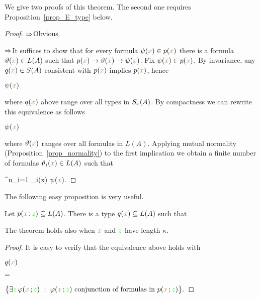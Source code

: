 We give two proofs of this theorem.  The second one requires Proposition~\ref{prop_E_type} below.

\vspace*{-\parskip}
\begin{proof}
$\Rightarrow$\quad Obvious. 

$\Rightarrow$\quad It suffices to show that for every formula $\psi({\color{brown} x})\in p({\color{brown} x})$ there is a formula $\vartheta({\color{brown} x})\in L(A)$ such that $p({\color{brown} x})\rightarrow\vartheta({\color{brown} x})\rightarrow\psi({\color{brown} x})$. Fix $\psi({\color{brown} x})\in p({\color{brown} x})$. By invariance, any $q({\color{brown} x})\in S(A)$ consistent with $p({\color{brown} x})$ implies $p({\color{brown} x})$, hence

\medrel{\imp}$\psi({\color{brown} x})$

where $q({\color{brown} x})$ above range over all types in $S_{\color{brown} x}(A)$. By compactness we can rewrite this equivalence as follows

\medrel{\imp}$\psi({\color{brown} x})$

where $\vartheta({\color{brown} x})$ ranges over all formulas in $L(A)$.
Applying mutual normality (Proposition~\ref{prop_normality}) to the first implication we obtain a finite number of formulas $\vartheta_i({\color{brown} x})\in L(A)$ such that 

{\imp}
{\bigvee^n_{i=1} \theta_i({\mr x})}
\medrel{\imp}
$\psi({\color{brown} x}).$
\end{proof}

The following easy proposition is very useful.

\begin{proposition}\label{prop_E_type}
Let $p({\color{brown} x}\,;{\color{green} z})\subseteq L(A)$.
There is a type $q({\color{brown} x})\subseteq L(A)$ such that


The theorem holds also when ${\color{brown} x}$ and ${\color{green} z}$ have length $\kappa$.
\end{proposition}

\begin{proof}
  It is easy to verify that the equivalence above holds with
  \def\medrel#1{\parbox{6ex}{$\displaystyle\hfil #1$}}
  \def\ceq#1#2#3{\parbox[b]{10ex}{$\displaystyle #1$}\medrel{#2}$\displaystyle  #3$}

  \ceq{\hfill q({\mr x})}{=}{\big\{ \E {\gr z}\,\phi({\mr x}\,;{\gr z})\ :\ \phi({\mr x}\,;{\gr z}) \textrm{ conjunction of formulas in } p({\mr x}\,;{\gr z}) \big\}.}
\end{proof}

